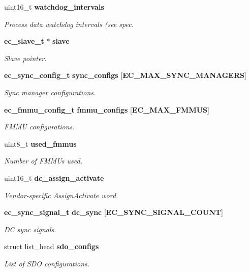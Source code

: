 \begin{DoxyCompactItemize}
uint16\-\_\-t {\bf watchdog\-\_\-intervals}
\begin{DoxyCompactList}\small\item\em \-Process data watchdog intervals (see spec. \end{DoxyCompactList}\item 
{\bf ec\-\_\-slave\-\_\-t} $\ast$ {\bf slave}
\begin{DoxyCompactList}\small\item\em \-Slave pointer. \end{DoxyCompactList}\item 
{\bf ec\-\_\-sync\-\_\-config\-\_\-t} {\bf sync\-\_\-configs} [{\bf \-E\-C\-\_\-\-M\-A\-X\-\_\-\-S\-Y\-N\-C\-\_\-\-M\-A\-N\-A\-G\-E\-R\-S}]
\begin{DoxyCompactList}\small\item\em \-Sync manager configurations. \end{DoxyCompactList}\item 
{\bf ec\-\_\-fmmu\-\_\-config\-\_\-t} {\bf fmmu\-\_\-configs} [{\bf \-E\-C\-\_\-\-M\-A\-X\-\_\-\-F\-M\-M\-U\-S}]
\begin{DoxyCompactList}\small\item\em \-F\-M\-M\-U configurations. \end{DoxyCompactList}\item 
uint8\-\_\-t {\bf used\-\_\-fmmus}
\begin{DoxyCompactList}\small\item\em \-Number of \-F\-M\-M\-Us used. \end{DoxyCompactList}\item 
uint16\-\_\-t {\bf dc\-\_\-assign\-\_\-activate}
\begin{DoxyCompactList}\small\item\em \-Vendor-\/specific \-Assign\-Activate word. \end{DoxyCompactList}\item 
{\bf ec\-\_\-sync\-\_\-signal\-\_\-t} {\bf dc\-\_\-sync} [{\bf \-E\-C\-\_\-\-S\-Y\-N\-C\-\_\-\-S\-I\-G\-N\-A\-L\-\_\-\-C\-O\-U\-N\-T}]
\begin{DoxyCompactList}\small\item\em \-D\-C sync signals. \end{DoxyCompactList}\item 
struct list\-\_\-head {\bf sdo\-\_\-configs}
\begin{DoxyCompactList}\small\item\em \-List of \-S\-D\-O configurations. \end{DoxyCompactList}\item 

\end{DoxyCompactItemize}
